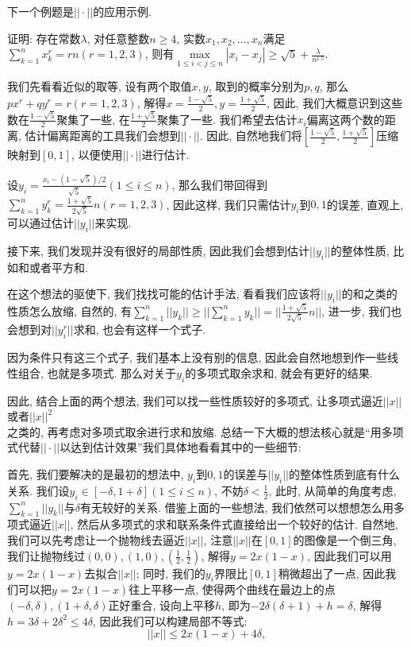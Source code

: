 \documentclass[lang=cn,12pt,thmcnt=section]{elegantbook}
\begin{document}
下一个例题是$||\cdot||$的应用示例.

\begin{example}
证明: 存在常数$\lambda$, 对任意整数$n\ge 4$, 实数$x_1,x_2,\dots{},x_n$满足$\sum_{k=1}^n x_k^r=rn(r=1,2,3)$, 则有$\max\limits_{1\le i<j\le n}|x_i-x_j|\ge \sqrt{5}+\frac{\lambda}{n^{1.5}}$.
\end{example}

\begin{analysis}
我们先看看近似的取等, 设有两个取值$x,y$, 取到的概率分别为$p,q$, 那么$px^r+qy^r=r(r=1,2,3)$, 解得$x=\frac{1-\sqrt{5}}{2},y=\frac{1+\sqrt{5}}{2}$, 因此, 我们大概意识到这些数在$\frac{1-\sqrt{5}}{2}$聚集了一些, 在$\frac{1+\sqrt{5}}{2}$聚集了一些. 我们希望去估计$x_i$偏离这两个数的距离, 估计偏离距离的工具我们会想到$||\cdot||$. 因此, 自然地我们将$[\frac{1-\sqrt{5}}{2},\frac{1+\sqrt{5}}{2}]$压缩映射到$[0,1]$, 以便使用$||\cdot||$进行估计.

设$y_i =\frac{x_i-(1-\sqrt{5})/2}{\sqrt{5}}(1\le i\le n)$, 那么我们带回得到$\sum_{k=1}^n y_k^r= \frac{1+\sqrt{5}}{2\sqrt{5}}n(r=1,2,3)$, 因此这样, 我们只需估计$y_i$到$0,1$的误差, 直观上, 可以通过估计$||y_i||$来实现. 

接下来, 我们发现并没有很好的局部性质, 因此我们会想到估计$||y_i||$的整体性质, 比如和或者平方和.

在这个想法的驱使下, 我们找找可能的估计手法, 看看我们应该将$||y_i||$的和之类的性质怎么放缩, 自然的, 有$\sum_{k=1}^n ||y_k||\ge ||\sum_{k=1}^n y_k||=|| \frac{1+\sqrt{5}}{2\sqrt{5}}n||$, 进一步, 我们也会想到对$||y_i^r||$求和, 也会有这样一个式子.

因为条件只有这三个式子, 我们基本上没有别的信息, 因此会自然地想到作一些线性组合, 也就是多项式. 那么对关于$y_i$的多项式取余求和, 就会有更好的结果. 

因此, 结合上面的两个想法, 我们可以找一些性质较好的多项式, 让多项式逼近$||x||$或者$||x||^2$\\之类的, 再考虑对多项式取余进行求和放缩. 总结一下大概的想法核心就是“{\heiti 用多项式代替}$||\cdot||$以达到估计效果”我们具体地看看其中的一些细节:  

首先, 我们要解决的是最初的想法中, $y_i$到$0,1$的误差与$||y_i||$的整体性质到底有什么关系. 我们设$y_i\in [-\delta,1+\delta](1\le i\le n)$, 不妨$\delta<\frac{1}{2}$, 此时, 从简单的角度考虑, $\sum_{k=1}^n ||y_k||$与$\delta$有无较好的关系. 借鉴上面的一些想法, 我们依然可以想想怎么用多项式逼近$||x||$, 然后从多项式的求和联系条件式直接给出一个较好的估计. 自然地, 我们可以先考虑让一个抛物线去逼近$||x||$, 注意$||x||$在$[0,1]$的图像是一个倒三角, 我们让抛物线过$(0,0),(1,0),(\frac{1}{2},\frac{1}{2})$, 解得$y=2x(1-x)$, 因此我们可以用$y=2x(1-x)$去拟合$||x||$; 同时, 我们的$y_i$界限比$[0,1]$稍微超出了一点, 因此我们可以把$y=2x(1-x)$往上平移一点, 使得两个曲线在最边上的点$(-\delta,\delta),(1+\delta,\delta)$正好重合, 设向上平移$h$, 即为$-2\delta(\delta+1)+h=\delta$, 解得$h=3\delta+2\delta^2\le 4\delta$, 因此我们可以构建局部不等式: 
\[
||x||\le 2x(1-x)+4\delta,
\]


\end{analysis}
\end{document}
